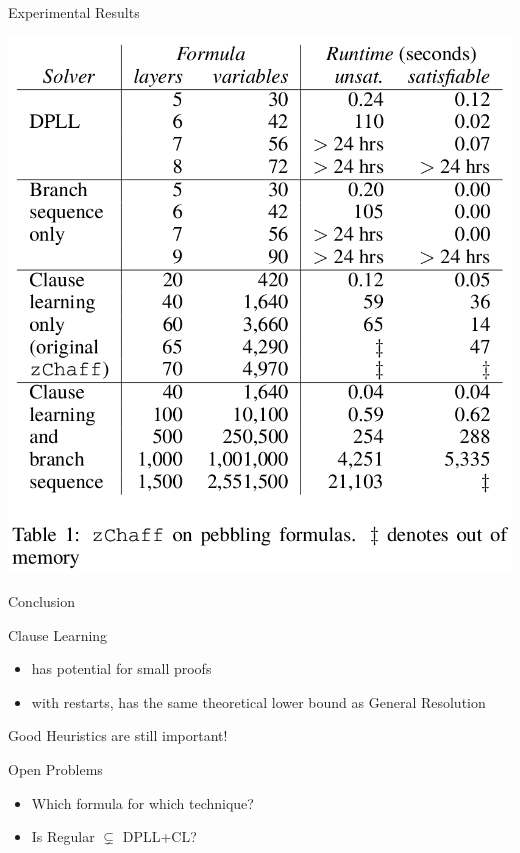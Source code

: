 \documentclass[page number]{beamer}
\begin{document}
\begin{frame}{Experimental Results}
  \begin{center}
    \includegraphics[scale=0.26]{table.png}
  \end{center}
\end{frame}

\begin{frame}{Conclusion}
  \begin{exampleblock}{Clause Learning}
    \begin{itemize}
    \item has potential for small proofs
    \item with restarts, has the same theoretical lower bound as General Resolution
    \end{itemize}
  \end{exampleblock}
  \vfill
  \begin{alertblock}{Good Heuristics are still important!}
  \end{alertblock}
  \vfill
  \begin{block}{Open Problems}
    \begin{itemize}
    \item Which formula for which technique?
    \item Is Regular $\varsubsetneq$ DPLL+CL?
    \end{itemize}
  \end{block}
\end{frame}
\end{document}
